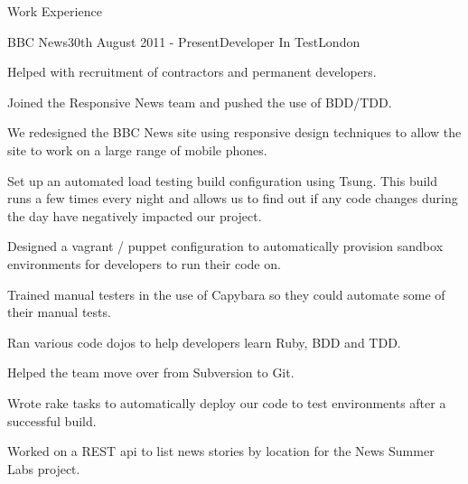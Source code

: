 \documentclass{resume}
\begin{document}
  \begin{rSection}{Work Experience}
    \begin{rSubsection}{BBC News}{30th August 2011 - Present}{Developer In Test}{London}
      \item Helped with recruitment of contractors and permanent developers.
      \item Joined the Responsive News team and pushed the use of BDD/TDD.
      \item We redesigned the BBC News site using responsive design techniques to allow the site to work on a large range of mobile phones.
      \item Set up an automated load testing build configuration using Tsung. This build runs a few times every night and allows us to find out if any code changes during the day have negatively impacted our project.
      \item Designed a vagrant / puppet configuration to automatically provision sandbox environments for developers to run their code on.
      \item Trained manual testers in the use of Capybara so they could automate some of their manual tests.
      \item Ran various code dojos to help developers learn Ruby, BDD and TDD.
      \item Helped the team move over from Subversion to Git.
      \item Wrote rake tasks to automatically deploy our code to test environments after a successful build.
      \item Worked on a REST api to list news stories by location for the News Summer Labs project.
    \end{rSubsection}


\end{rSection}
\end{document}
